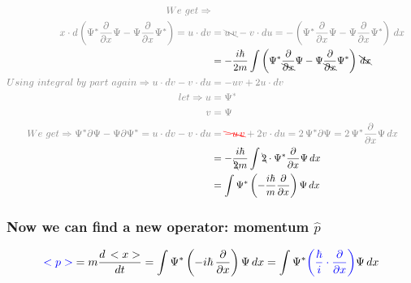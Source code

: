\begin{align}
        \color{gray} We~get\Rightarrow\\
        \color{gray} x \cdot d \left( \Psi^*\dfrac{\partial}{\partial x}\Psi - \Psi \dfrac{\partial}{\partial x}\Psi^* \right)
        = u\cdot dv
        &\color{gray} = \bcancel{u\,v} - v\cdot du
        = - \left( \Psi^*\dfrac{\partial}{\partial x}\Psi - \Psi \dfrac{\partial}{\partial x}\Psi^* \right)\,dx\\
        &=  -\dfrac{i\hbar}{2m} \int \left( \Psi^*\dfrac{\partial}{\bcancel{\partial x}}\Psi - \Psi \dfrac{\partial}{\bcancel{\partial x}}\Psi^* \right) \,\bcancel{dx}\\
        \color{gray} Using~integral~by~part~again\Rightarrow u\cdot dv - v\cdot du
        &\color{gray} = - uv + 2u\cdot dv\\
        \color{gray} let\Rightarrow u 
        &\color{gray} = \Psi^*\\
        \color{gray} v
        &\color{gray} = \Psi\\
        \color{gray} We~get\Rightarrow
        \color{gray} \Psi^*\partial\Psi - \Psi \partial\Psi^*
        = u\cdot dv - v\cdot du
        &\color{gray} = {\color{red}\bcancel{-u\,v}} + 2v\cdot du
        = 2\,\Psi^* \partial\Psi
        = 2\,\Psi^* \dfrac{\partial}{\partial x}\Psi\,dx\\
        &= -\dfrac{i\hbar}{\bcancel{2}m} \int \bcancel{2}\cdot \Psi^* \dfrac{\partial}{\partial x}\Psi\,dx\\
        &= \int \Psi^* \left(-\dfrac{i\hbar}{m}\dfrac{\partial}{\partial x}\right)\Psi\,dx
    \end{align}
    \subsubsection*{Now we can find a new operator: momentum $\hat{p}$}
    \[
        {\color{blue}<p>} = m\dfrac{d\,<x>}{dt} = \int \Psi^* \left(-i\hbar\,\dfrac{\partial}{\partial x}\right)\Psi\,dx = \int \Psi^* {\color{blue}\left(\dfrac{\hbar}{i}\cdot\dfrac{\partial}{\partial x}\right)}\Psi\,dx
    \]
